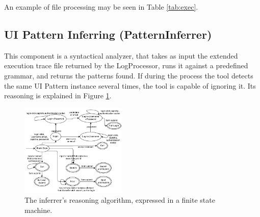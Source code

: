 \documentclass[conference]{IEEEtran}
\begin{document}
An example of file processing may be seen in Table \ref{tab:exec}.

\begin{table}[!htb]
\caption{Example of an execution trace file, and of processed lines.}
\label{tab:exec1}
\end{table}

\subsection{UI Pattern Inferring (PatternInferrer)}\label{sec:inf}
This component is a syntactical analyzer, that takes as input the extended execution trace file returned by the LogProcessor, runs it against a predefined grammar, and returns the patterns found. If during the process the tool detects the same UI Pattern instance several times, the tool is capable of ignoring it. Its reasoning is explained in Figure \ref{fig:inferrer}.

\begin{figure}[!htb]
\centering
\includegraphics[width=0.45\textwidth]{Global_State_Machine.pdf}
\caption{The inferrer's reasoning algorithm, expressed in a finite state machine.}
\label{fig:inferrer}
\end{figure}
\end{document}
